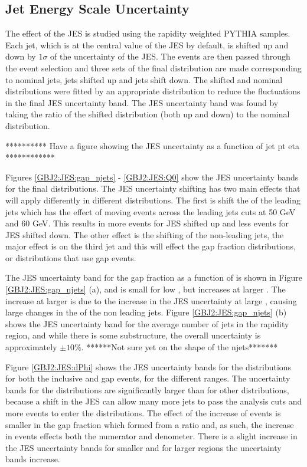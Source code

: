 \subsection{Jet Energy Scale Uncertainty}

The effect of the JES is studied using the rapidity weighted PYTHIA samples.
Each jet, which is at the central value of the JES by default, is shifted up and down by $1 \sigma$ of the uncertainty of the JES.
The events are then passed through the event selection and three sets of the final distribution are made corresponding to nominal jets,  jets shifted up and jets shift down.
The shifted and nominal distributions were fitted by an appropriate distribution to reduce the fluctuations in the final JES uncertainty band.
The JES uncertainty band was found by taking the ratio of the shifted distribution (both up and down) to the nominal distribution.


********** Have a figure showing the JES uncertainty as a function of jet pt eta  ************

Figures \ref{GBJ2:JES:gap_njets} - \ref{GBJ2:JES:Q0} show the JES uncertainty bands for the final distributions.
The JES uncertainty shifting has two main effects that will apply differently in different distributions.
The first is shift the \pt{} of the leading jets which has the effect of moving events across the leading jets \pt{} cuts at 50 GeV and 60 GeV.
This results in more events for JES shifted up and less events for JES shifted down. 
The other effect is the shifting of the non-leading jets, the major effect is on the third jet \pt{} and this will effect the gap fraction distributions, or distributions that use gap events. 

The JES uncertainty band for the gap fraction as a function of \dy{} is shown in Figure \ref{GBJ2:JES:gap_njets} (a), and is small for low \dy{}, but increases at larger \dy{}.
The increase at larger \dy{} is due to the increase in the JES uncertainty at large \dy{}, causing large changes in the \pt{} of the non leading jets.
Figure \ref{GBJ2:JES:gap_njets} (b) shows the JES uncertainty band for the average number of jets in the rapidity region, and while there is some substructure, the overall uncertainty is approximately $\pm 10 \%$.
******Not sure yet on the shape of the njets*******


Figure \ref{GBJ2:JES:dPhi} shows the JES uncertainty bands for the \dphi{} distributions for both the inclusive and gap events, for the different \dy{} ranges.
The uncertainty bands for the \dphi{} distributions are significantly larger than for other distributions, because a shift in the JES can allow many more jets to pass the analysis \pt{} cuts and more events to enter the distributions.
The effect of the increase of events is smaller in the gap fraction which formed from a ratio and, as such, the increase in events effects both the numerator and denometer.
There is a slight increase in the JES uncertainty bands for smaller \dphi{} and for larger \dy{} regions the uncertainty bands increase.

